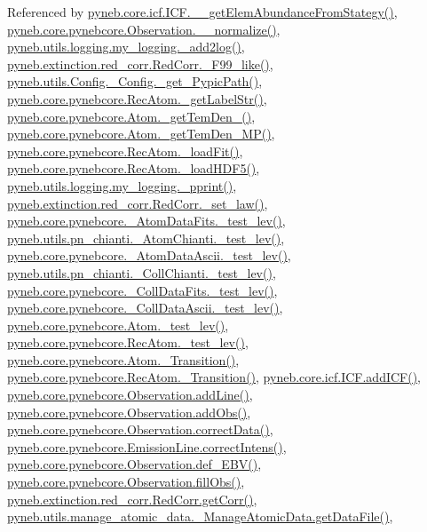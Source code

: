 Referenced by \hyperlink{icf_8py_source_l01075}{pyneb.\-core.\-icf.\-I\-C\-F.\-\_\-\-\_\-get\-Elem\-Abundance\-From\-Stategy()}, \hyperlink{pynebcore_8py_source_l04007}{pyneb.\-core.\-pynebcore.\-Observation.\-\_\-\-\_\-normalize()}, \hyperlink{logging_8py_source_l00059}{pyneb.\-utils.\-logging.\-my\-\_\-logging.\-\_\-add2log()}, \hyperlink{red__corr_8py_source_l00658}{pyneb.\-extinction.\-red\-\_\-corr.\-Red\-Corr.\-\_\-\-F99\-\_\-like()}, \hyperlink{_config_8py_source_l00115}{pyneb.\-utils.\-Config.\-\_\-\-Config.\-\_\-get\-\_\-\-Pypic\-Path()}, \hyperlink{pynebcore_8py_source_l02970}{pyneb.\-core.\-pynebcore.\-Rec\-Atom.\-\_\-get\-Label\-Str()}, \hyperlink{pynebcore_8py_source_l01869}{pyneb.\-core.\-pynebcore.\-Atom.\-\_\-get\-Tem\-Den\-\_()}, \hyperlink{pynebcore_8py_source_l02046}{pyneb.\-core.\-pynebcore.\-Atom.\-\_\-get\-Tem\-Den\-\_\-\-M\-P()}, \hyperlink{pynebcore_8py_source_l02754}{pyneb.\-core.\-pynebcore.\-Rec\-Atom.\-\_\-load\-Fit()}, \hyperlink{pynebcore_8py_source_l02714}{pyneb.\-core.\-pynebcore.\-Rec\-Atom.\-\_\-load\-H\-D\-F5()}, \hyperlink{logging_8py_source_l00051}{pyneb.\-utils.\-logging.\-my\-\_\-logging.\-\_\-pprint()}, \hyperlink{red__corr_8py_source_l00176}{pyneb.\-extinction.\-red\-\_\-corr.\-Red\-Corr.\-\_\-set\-\_\-law()}, \hyperlink{pynebcore_8py_source_l00178}{pyneb.\-core.\-pynebcore.\-\_\-\-Atom\-Data\-Fits.\-\_\-test\-\_\-lev()}, \hyperlink{pn__chianti_8py_source_l00304}{pyneb.\-utils.\-pn\-\_\-chianti.\-\_\-\-Atom\-Chianti.\-\_\-test\-\_\-lev()}, \hyperlink{pynebcore_8py_source_l00447}{pyneb.\-core.\-pynebcore.\-\_\-\-Atom\-Data\-Ascii.\-\_\-test\-\_\-lev()}, \hyperlink{pn__chianti_8py_source_l00472}{pyneb.\-utils.\-pn\-\_\-chianti.\-\_\-\-Coll\-Chianti.\-\_\-test\-\_\-lev()}, \hyperlink{pynebcore_8py_source_l00677}{pyneb.\-core.\-pynebcore.\-\_\-\-Coll\-Data\-Fits.\-\_\-test\-\_\-lev()}, \hyperlink{pynebcore_8py_source_l01045}{pyneb.\-core.\-pynebcore.\-\_\-\-Coll\-Data\-Ascii.\-\_\-test\-\_\-lev()}, \hyperlink{pynebcore_8py_source_l01525}{pyneb.\-core.\-pynebcore.\-Atom.\-\_\-test\-\_\-lev()}, \hyperlink{pynebcore_8py_source_l02672}{pyneb.\-core.\-pynebcore.\-Rec\-Atom.\-\_\-test\-\_\-lev()}, \hyperlink{pynebcore_8py_source_l01433}{pyneb.\-core.\-pynebcore.\-Atom.\-\_\-\-Transition()}, \hyperlink{pynebcore_8py_source_l02812}{pyneb.\-core.\-pynebcore.\-Rec\-Atom.\-\_\-\-Transition()}, \hyperlink{icf_8py_source_l00797}{pyneb.\-core.\-icf.\-I\-C\-F.\-add\-I\-C\-F()}, \hyperlink{pynebcore_8py_source_l03558}{pyneb.\-core.\-pynebcore.\-Observation.\-add\-Line()}, \hyperlink{pynebcore_8py_source_l03589}{pyneb.\-core.\-pynebcore.\-Observation.\-add\-Obs()}, \hyperlink{pynebcore_8py_source_l04028}{pyneb.\-core.\-pynebcore.\-Observation.\-correct\-Data()}, \hyperlink{pynebcore_8py_source_l03447}{pyneb.\-core.\-pynebcore.\-Emission\-Line.\-correct\-Intens()}, \hyperlink{pynebcore_8py_source_l03983}{pyneb.\-core.\-pynebcore.\-Observation.\-def\-\_\-\-E\-B\-V()}, \hyperlink{pynebcore_8py_source_l03574}{pyneb.\-core.\-pynebcore.\-Observation.\-fill\-Obs()}, \hyperlink{red__corr_8py_source_l00211}{pyneb.\-extinction.\-red\-\_\-corr.\-Red\-Corr.\-get\-Corr()}, \hyperlink{manage__atomic__data_8py_source_l00297}{pyneb.\-utils.\-manage\-\_\-atomic\-\_\-data.\-\_\-\-Manage\-Atomic\-Data.\-get\-Data\-File()}, 
